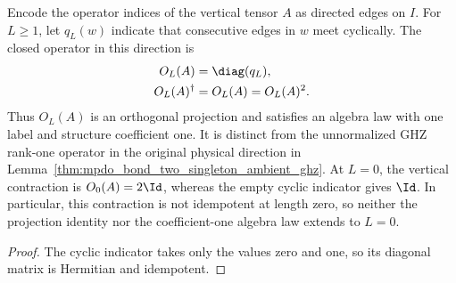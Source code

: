 \begin{lemma}%
    \label{thm:mpdo_bond_two_singleton_retained_projection}
    \leanok
    Encode the operator indices of the vertical tensor $A$ as directed
    edges on $I$. For $L\geq1$, let $q_L(w)$ indicate that consecutive
    edges in $w$ meet cyclically. The closed operator in this direction is
    \begin{align}
        O_L(A)         & =\diag(q_L),
        \notag                             \\
        O_L(A)^\dagger & =O_L(A)=O_L(A)^2.
        \notag
    \end{align}
    Thus $O_L(A)$ is an orthogonal projection and satisfies an algebra law
    with one label and structure coefficient one. It is distinct from the
    unnormalized GHZ rank-one operator in the original physical direction
    in Lemma~\ref{thm:mpdo_bond_two_singleton_ambient_ghz}.
    At $L=0$, the vertical contraction is $O_0(A)=2\Id$, whereas the empty
    cyclic indicator gives $\Id$. In particular, this contraction is not
    idempotent at length zero, so neither the projection identity nor the
    coefficient-one algebra law extends to $L=0$.
\end{lemma}
\begin{proof}\leanok
    The cyclic indicator takes only the values zero and one, so its diagonal
    matrix is Hermitian and idempotent.
\end{proof}

